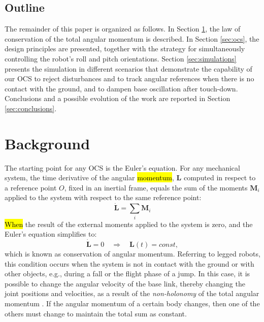 \documentclass[sensors,article,accept,pdftex,moreauthors]{Definitions/mdpi}
\begin{document}
\subsection{Outline}
The remainder of this paper is organized as follows. In Section \ref{sec:background}, the law of conservation of the total angular momentum is described. In Section \ref{sec:ocs}, the design principles are presented, together with the strategy for simultaneously controlling the robot's roll and pitch orientations. Section \ref{sec:simulations} presents the simulation in different scenarios that demonstrate the capability of our OCS to reject disturbances and to track angular references when there is no contact with the ground, and to dampen base oscillation after touch-down. Conclusions and a possible evolution of the work are reported in Section \ref{sec:conclusions}.


\section{Background}
\label{sec:background}
The starting point for any OCS is the Euler's equation. For any mechanical system, the time derivative of the angular \hl{momentum}, %
 $\bm{L}$ computed in respect to a reference point $O$, fixed in an inertial frame, equals the sum of the moments $\bm{M}_i$ applied to the system with respect to the same reference point:
\begin{equation}
\dot{\bm{L}} = \sum_i \bm{M}_i
\end{equation}
\hl{When} %
 the result of the external moments applied to the system is zero, and the Euler's equation simplifies to:
 \begin{equation}
\dot{\bm{L}} = 0 \quad \Rightarrow \quad \bm{L}(t) = const,
\label{eq:cons_ang_mom}
\end{equation}
which is known as conservation of angular momentum.
Referring to legged robots, this condition occurs when the system is not in contact with the ground or with other objects, e.g., during a fall or the flight phase of a jump.
In this case, it is possible to change the angular velocity of the base link, thereby changing the joint positions and velocities, as a result of the \textit{non-holonomy} of the total angular momentum \cite{wieber2016modeling}. If the angular momentum of a certain body changes, then one of the others must change to maintain the total sum as constant.
\end{document}
